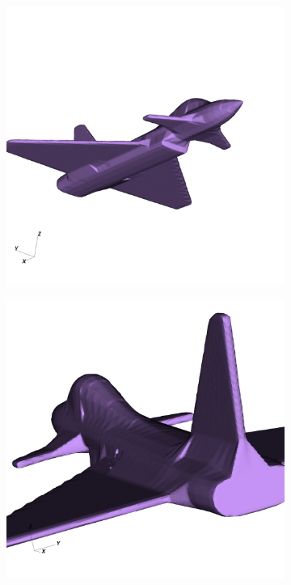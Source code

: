\documentclass[final,3p,times,twocolumn]{elsarticle}
\begin{document}
\begin{figure}
\centering
        \begin{subfigure}[b]{0.475\textwidth}
            \centering
            \includegraphics[width=\textwidth]{visit0016.png}
            \caption{}    
            \label{ef1}
        \end{subfigure}
        \hfill
        \begin{subfigure}[b]{0.475\textwidth}  
            \centering 
            \includegraphics[width=\textwidth]{visit0013.png}

\end{subfigure}
\end{figure}
\end{document}
